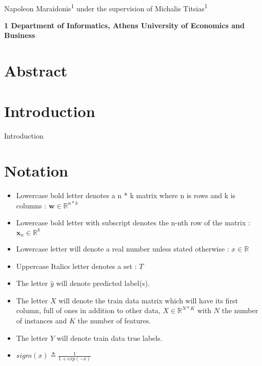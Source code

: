 \documentclass[10pt,letterpaper]{article}
\begin{document}
\vspace*{0.35in}
	\begin{flushleft}
		{\Large
			\textbf{}
		}
		\newline
		\\
		Napoleon Maraidonis\textsuperscript{1} under the supervision of
		Michalis Titsias\textsuperscript{1}		
						
		\bigskip
		\bf{1} Department of Informatics, Athens University of Economics and Business
		\\		
	\end{flushleft}
	
	\section*{Abstract}
	
	
	\section*{Introduction}
	
	Introduction \cite{extreme_MLC_omar} \cite{extreme_MLC_rep} \cite{MLC_finland}
	

	\section*{Notation}

	\begin{itemize}
		\item Lowercase bold letter denotes a n * k matrix where n is rows and k is columns :  $\textbf{w} \in  {\mathbb R}^{n * k}$
		
		\item Lowercase bold letter with subscript denotes the n-nth row of the matrix : $\textbf{x}_{n} \in  {\mathbb R}^{k}$
				
		\item Lowercase letter will denote a real number unless stated otherwise	:	$x \in {\mathbb R}$
		
		\item Uppercase Italics letter denotes a set : $\textit{T} $
		
		\item The letter $\hat{y}$ will denote predicted label(s).
		
		\item The letter $X$ will denote the train data matrix which will have its first column, full of ones in addition to other data, $X \in {\mathbb R}^{N * K}$ with $N$ the number of instances and $K$ the number of features.
		
		\item The letter $Y$ will denote train data true labels.
		
		\item $sigm(x) \triangleq \frac{1}{1 + exp(-x)}$
		
		

	\end{itemize}
	\newpage
	
\end{document}
